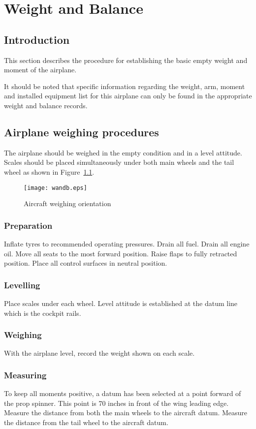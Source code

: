 \chapter{Weight and Balance}
\thispagestyle{fancy}
\minitoc[n] %

\section{Introduction}
This section describes the procedure for establishing the basic empty weight and moment of the airplane.  

It should be noted that specific information regarding the weight, arm, moment and installed equipment list for this airplane can only be found in the appropriate weight and balance records.

\section{Airplane weighing procedures}
The airplane should be weighed in the empty condition and in a level attitude.  Scales should be placed simultaneously under both main wheels and the tail wheel as shown in Figure~\ref{fig:wandb}.
\begin{figure}[h]
\centering
\texttt{[image: wandb.eps]}
\caption{Aircraft weighing orientation}
\label{fig:wandb}
\end{figure}

\subsection{Preparation}
Inflate tyres to recommended operating pressures.  Drain all fuel.  Drain all engine oil.  Move all seats to the most forward position.  Raise flaps to fully retracted position.  Place all control surfaces in neutral position.  
\subsection{Levelling}
Place scales under each wheel.  Level attitude is established at the datum line which is the cockpit rails.  
\subsection{Weighing}
With the airplane level, record the weight shown on each scale.  
\subsection{Measuring}
To keep all moments positive, a datum has been selected at a point forward of the prop spinner.  This point is 70 inches in front of the wing leading edge.  Measure the distance from both the main wheels to the aircraft datum.  Measure the distance from the tail wheel to the aircraft datum.

